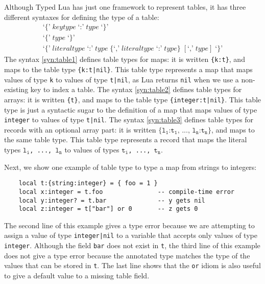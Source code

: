 Although Typed Lua has just one framework to represent tables,
it has three different syntaxes for defining the type of a table:
\begin{align}
\label{syn:table1}
\texttt{`\{'} \; \textit{keytype} \; \texttt{`:'} \; \textit{type} \; \texttt{`\}'}\\
\label{syn:table2}
\texttt{`\{'} \; \textit{type} \; \texttt{`\}'}\\
\label{syn:table3}
\texttt{`\{'} \; \textit{literaltype} \; \texttt{`:'} \; \textit{type} \;
\{\texttt{`,'} \; \textit{literaltype} \; \texttt{`:'} \; \textit{type}\} \;
[\texttt{`,'} \; \textit{type}] \; \texttt{`\}'}
\end{align}
The syntax \ref{syn:table1} defines table types for maps:
it is written \texttt{\{k:t\}},
and maps to the table type \texttt{\{k:t|nil\}}.
This table type represents a map that maps values of type
\texttt{k} to values of type \texttt{t|nil},
as Lua returns \texttt{nil} when we use a non-existing key to index a table.
The syntax \ref{syn:table2} defines table types for arrays:
it is written \texttt{\{t\}},
and maps to the table type \texttt{\{integer:t|nil\}}.
This table type is just a syntactic sugar to the definition of a
map that maps values of type \texttt{integer} to values of type \texttt{t|nil}.
The syntax \ref{syn:table3} defines table types for records with an
optional array part: it is written
$\texttt{\{l}{_\texttt{1}}\texttt{:t}_{\texttt{1}}
\texttt{, ..., l}{_\texttt{n}}\texttt{:t}_{\texttt{n}}\texttt{\}}$,
and maps to the same table type.
This table type represents a record that maps the literal types
$\texttt{l}_{\texttt{i}}$\texttt{, ..., }$\texttt{l}_{\texttt{n}}$
to values of types $\texttt{t}_{\texttt{i}}$\texttt{, ..., }$\texttt{t}_{\texttt{n}}$.

Next, we show one example of table type to type a map from strings to integers:
\begin{verbatim}
    local t:{string:integer} = { foo = 1 } 
    local x:integer = t.foo               -- compile-time error
    local y:integer? = t.bar              -- y gets nil
    local z:integer = t["bar"] or 0       -- z gets 0 
\end{verbatim}

The second line of this example gives a type error because we are
attempting to assign a value of type \texttt{integer|nil} to a
variable that accepts only values of type \texttt{integer}.
Although the field \texttt{bar} does not exist in \texttt{t}, the third
line of this example does not give a type error because the
annotated type matches the type of the values that can be stored in
\texttt{t}.
The last line shows that the \texttt{or} idiom is also useful to
give a default value to a missing table field.

